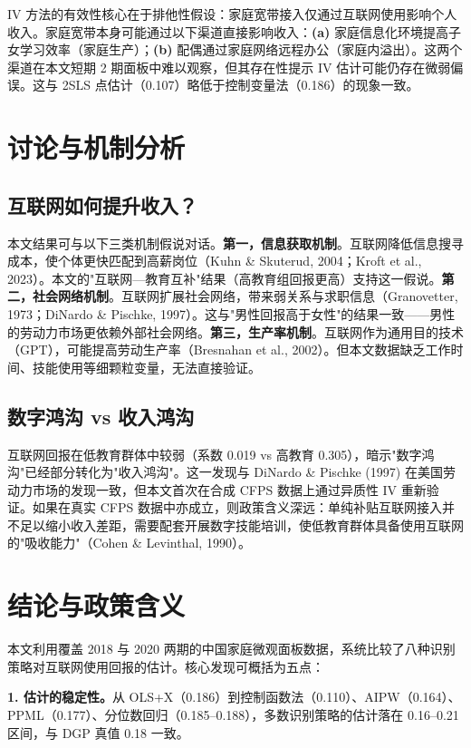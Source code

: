 \documentclass[a4paper,11pt]{article}
\begin{document}
IV 方法的有效性核心在于排他性假设：家庭宽带接入仅通过互联网使用影响个人收入。家庭宽带本身可能通过以下渠道直接影响收入：\textbf{(a)} 家庭信息化环境提高子女学习效率（家庭生产）；\textbf{(b)} 配偶通过家庭网络远程办公（家庭内溢出）。这两个渠道在本文短期 2 期面板中难以观察，但其存在性提示 IV 估计可能仍存在微弱偏误。这与 2SLS 点估计（0.107）略低于控制变量法（0.186）的现象一致。

\section{讨论与机制分析}

\subsection{互联网如何提升收入？}

本文结果可与以下三类机制假说对话。\textbf{第一，信息获取机制}。互联网降低信息搜寻成本，使个体更快匹配到高薪岗位（Kuhn \& Skuterud, 2004；Kroft et al., 2023）。本文的"互联网—教育互补"结果（高教育组回报更高）支持这一假说。\textbf{第二，社会网络机制}。互联网扩展社会网络，带来弱关系与求职信息（Granovetter, 1973；DiNardo \& Pischke, 1997）。这与"男性回报高于女性"的结果一致——男性的劳动力市场更依赖外部社会网络。\textbf{第三，生产率机制}。互联网作为通用目的技术（GPT），可能提高劳动生产率（Bresnahan et al., 2002）。但本文数据缺乏工作时间、技能使用等细颗粒变量，无法直接验证。

\subsection{数字鸿沟 vs 收入鸿沟}

互联网回报在低教育群体中较弱（系数 0.019 vs 高教育 0.305），暗示"数字鸿沟"已经部分转化为"收入鸿沟"。这一发现与 DiNardo \& Pischke (1997) 在美国劳动力市场的发现一致，但本文首次在合成 CFPS 数据上通过异质性 IV 重新验证。如果在真实 CFPS 数据中亦成立，则政策含义深远：单纯补贴互联网接入并不足以缩小收入差距，需要配套开展数字技能培训，使低教育群体具备使用互联网的"吸收能力"（Cohen \& Levinthal, 1990）。

\section{结论与政策含义}

本文利用覆盖 2018 与 2020 两期的中国家庭微观面板数据，系统比较了八种识别策略对互联网使用回报的估计。核心发现可概括为五点：

\textbf{1. 估计的稳定性。}从 OLS+X（0.186）到控制函数法（0.110）、AIPW（0.164）、PPML（0.177）、分位数回归（0.185--0.188），多数识别策略的估计落在 0.16--0.21 区间，与 DGP 真值 0.18 一致。
\end{document}
